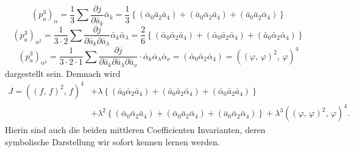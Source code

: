 \documentclass[11pt]{article}
\providecommand{\weberpage}[1]{}
\begin{document}
\weberpage{64}
\[
(p_a^3)_\alpha = \frac{1}{3}\sum\frac{\partial j}{\partial\bar a_k}\bar\alpha_k = \frac{1}{3}\left\{(\bar\alpha_0\bar a_2\bar a_4)+(\bar a_0\bar\alpha_2\bar a_4)+(\bar a_0\bar a_2\bar\alpha_4)\right\}
\]
\[
(p_a^3)_{\alpha^2} = \frac{1}{3\cdot 2}\sum\frac{\partial j}{\partial\bar a_k\partial\bar a_\lambda}\bar\alpha_k\bar\alpha_\lambda = \frac{2}{6}\left\{(\bar\alpha_0\bar\alpha_2\bar a_4)+(\bar\alpha_0\bar a_2\bar\alpha_4)+(\bar a_0\bar\alpha_2\bar\alpha_4)\right\}
\]
\[
(p_a^3)_{\alpha^3} = \frac{1}{3\cdot 2\cdot 1}\sum\frac{\partial j}{\partial\bar a_k\partial\bar a_\lambda\partial\bar a_\nu}\cdot\bar\alpha_k\bar\alpha_\lambda\bar\alpha_\nu = (\bar\alpha_0\bar\alpha_2\bar\alpha_4) = ((\varphi,\,\varphi)^2,\,\varphi)^4
\]
dargestellt sein. Demnach wird
\[
\begin{aligned}
J = ((f,\,f)^2,\,f)^4 &+ \lambda\left\{(\bar a_0\bar\alpha_2\bar a_4)+(\bar a_0\bar a_2\bar\alpha_4)+(\bar\alpha_0\bar a_2\bar a_4)\right\}\\
&+ \lambda^2\left\{(\bar\alpha_0\bar\alpha_2\bar a_4)+(\bar\alpha_0\bar a_2\bar\alpha_4)+(\bar a_0\bar\alpha_2\bar\alpha_4)\right\} + \lambda^3((\varphi,\,\varphi)^2,\,\varphi)^4.
\end{aligned}
\]
Hierin sind auch die beiden mittleren Coefficienten Invarianten, deren
symbolische Darstellung wir sofort kennen lernen werden.
\end{document}
